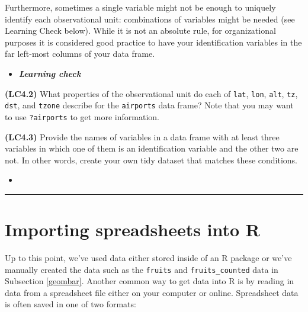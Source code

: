 \documentclass[12pt,]{krantz}
\newenvironment{rmdblock}[1]
  {\begin{shaded*}
  \begin{itemize}
  \renewcommand{\labelitemi}{
    \raisebox{-.7\height}[0pt][0pt]{
    }
  }
  \item
  }
  {
  \end{itemize}
  \end{shaded*}
  }
\newenvironment{learncheck}
  {\begin{rmdblock}{warning}}
  {\end{rmdblock}}
\theoremstyle{definition}
\theoremstyle{definition}
\theoremstyle{definition}
\theoremstyle{remark}
\begin{document}
Furthermore, sometimes a single variable might not be enough to uniquely
identify each observational unit: combinations of variables might be
needed (see Learning Check below). While it is not an absolute rule, for
organizational purposes it is considered good practice to have your
identification variables in the far left-most columns of your data
frame.

\begin{learncheck}
\textbf{\emph{Learning check}}
\end{learncheck}

\textbf{(LC4.2)} What properties of the observational unit do each of
\texttt{lat}, \texttt{lon}, \texttt{alt}, \texttt{tz}, \texttt{dst}, and
\texttt{tzone} describe for the \texttt{airports} data frame? Note that
you may want to use \texttt{?airports} to get more information.

\textbf{(LC4.3)} Provide the names of variables in a data frame with at
least three variables in which one of them is an identification variable
and the other two are not. In other words, create your own tidy dataset
that matches these conditions.

\begin{learncheck}

\end{learncheck}

\begin{center}\rule{0.5\linewidth}{\linethickness}\end{center}

\section{Importing spreadsheets into R}\label{csv}

Up to this point, we've used data either stored inside of an R package
or we've manually created the data such as the \texttt{fruits} and
\texttt{fruits\_counted} data in Subsection \ref{geombar}. Another
common way to get data into R is by reading in data from a spreadsheet
file either on your computer or online. Spreadsheet data is often saved
in one of two formats:
\end{document}
